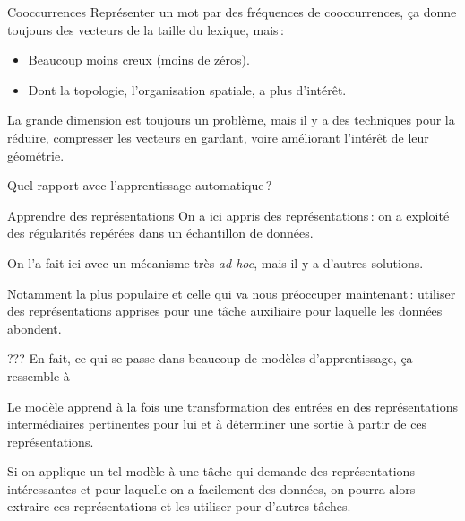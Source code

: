 \documentclass[
	xcolor={svgnames},
	aspectratio=169,
	french,
]{beamer}
\begin{document}
\begin{frame}{Cooccurrences}
	Représenter un mot par des fréquences de cooccurrences, ça donne toujours des vecteurs de la taille du lexique, \alert<1>{mais} :

	\pause

	\begin{itemize}[<+->]
		\item Beaucoup moins creux (moins de zéros).
		\item Dont la \alert{topologie}, l'organisation spatiale, a plus d'intérêt.
	\end{itemize}

	\pause

	La grande dimension est toujours un problème, mais il y a des techniques pour la réduire, \alert{compresser} les vecteurs en gardant, voire améliorant l'intérêt de leur \alert{géométrie}.
\end{frame}

\begin{frame}[standout]
	Quel rapport avec l'apprentissage automatique ?
\end{frame}

\begin{frame}{Apprendre des représentations}
	On a ici \alert{appris} des représentations : on a exploité des \alert{régularités} repérées dans un \alert{échantillon de données}.

	\pause

	On l'a fait ici avec un mécanisme très \emph{ad hoc}, mais il y a d'autres solutions.

	\pause

	Notamment la plus populaire et celle qui va nous préoccuper maintenant : utiliser des représentations apprises pour une \alert{tâche auxiliaire} pour laquelle les données abondent.
\end{frame}

\begin{frame}[fragile]{???}
	En fait, ce qui se passe dans beaucoup de modèles d'apprentissage, ça ressemble à

	\begin{figure}
	\end{figure}

	\pause

	Le modèle apprend à la fois une transformation des entrées en des \alert{représentations intermédiaires} pertinentes pour lui et à déterminer une sortie à partir de ces représentations.

	\pause

	Si on applique un tel modèle à une tâche qui demande des représentations intéressantes et pour laquelle on a facilement des données, on pourra alors extraire ces représentations et les utiliser pour d'autres tâches.
\end{frame}
\end{document}
